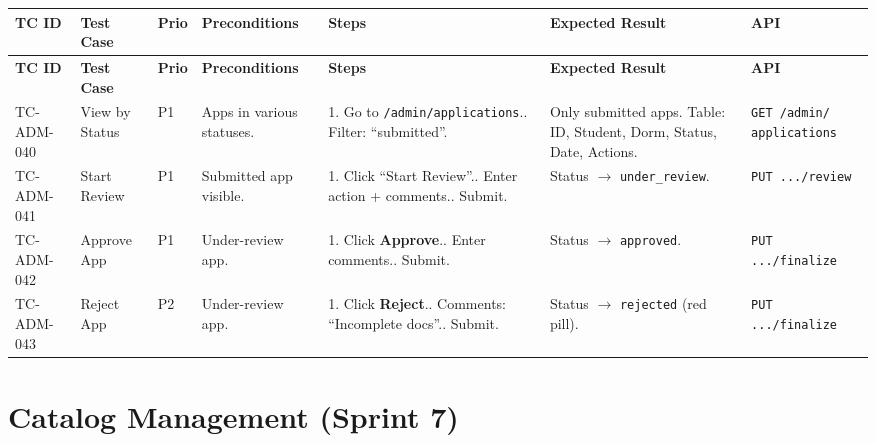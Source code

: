\documentclass[12pt,a4paper]{article}
\begin{document}
\begin{longtable}{L{2cm} L{3cm} L{1cm} L{4cm} L{5.5cm} L{5.5cm} L{3cm}}
\toprule
\textbf{TC ID} & \textbf{Test Case} & \textbf{Prio} & \textbf{Preconditions} & \textbf{Steps} & \textbf{Expected Result} & \textbf{API} \\
\midrule
\endfirsthead \toprule \textbf{TC ID} & \textbf{Test Case} & \textbf{Prio} & \textbf{Preconditions} & \textbf{Steps} & \textbf{Expected Result} & \textbf{API} \\ \midrule \endhead \bottomrule \endfoot

TC-ADM-040 & View by Status & P1 & Apps in various statuses. & 1. Go to \texttt{/admin/applications}.. Filter: ``submitted''. & Only submitted apps. Table: ID, Student, Dorm, Status, Date, Actions. & \texttt{GET /admin/ applications} \\
\midrule
TC-ADM-041 & Start Review & P1 & Submitted app visible. & 1. Click ``Start Review''.. Enter action + comments.. Submit. & Status $\rightarrow$ \texttt{under\_review}. & \texttt{PUT .../review} \\
\midrule
TC-ADM-042 & Approve App & P1 & Under-review app. & 1. Click \textbf{Approve}.. Enter comments.. Submit. & Status $\rightarrow$ \texttt{approved}. & \texttt{PUT .../finalize} \\
\midrule
TC-ADM-043 & Reject App & P2 & Under-review app. & 1. Click \textbf{Reject}.. Comments: ``Incomplete docs''.. Submit. & Status $\rightarrow$ \texttt{rejected} (red pill). & \texttt{PUT .../finalize} \\
\end{longtable}

\section{Catalog Management (Sprint 7)}
\end{document}

